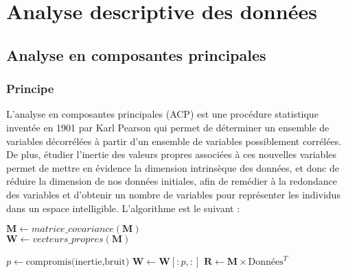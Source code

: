 \documentclass[11pt,fleqn,a4paper,openany,frenchb]{book} %
\begin{document}
\chapter{Analyse descriptive des données}
\section{Analyse en composantes principales}
\subsection{Principe}
L'analyse en composantes principales (ACP) est une procédure statistique inventée en 1901 par Karl Pearson qui permet de déterminer un ensemble de variables décorrélées à partir d'un ensemble de variables possiblement corrélées. De plus, étudier l'inertie des valeurs propres associées à ces nouvelles variables permet de mettre en évidence la dimension intrinsèque des données, et donc de réduire la dimension de nos données initiales, afin de remédier à la redondance des variables et d'obtenir un nombre de variables pour représenter les individus dans un espace intelligible. L'algorithme est le suivant : \vspace{0.2cm}\par

\begin{definition}
\begin{algorithm}[H]
 \BlankLine
 \BlankLine
 $\mathbf{M}\leftarrow matrice\_covariance(\mathbf{M})$\\
 $\mathbf{W}\leftarrow vecteurs\_propres(\mathbf{M})$\\
 \BlankLine

 $p \leftarrow  \textrm{compromis(inertie,bruit)}$  
 $\mathbf{W}\leftarrow \mathbf{W}[:p,:]$  
 $\mathbf{R}\leftarrow \mathbf{M} \times\textrm{Données}^T$\\
\label{alg:ACP}
\end{algorithm}

\end{definition}
\end{document}

